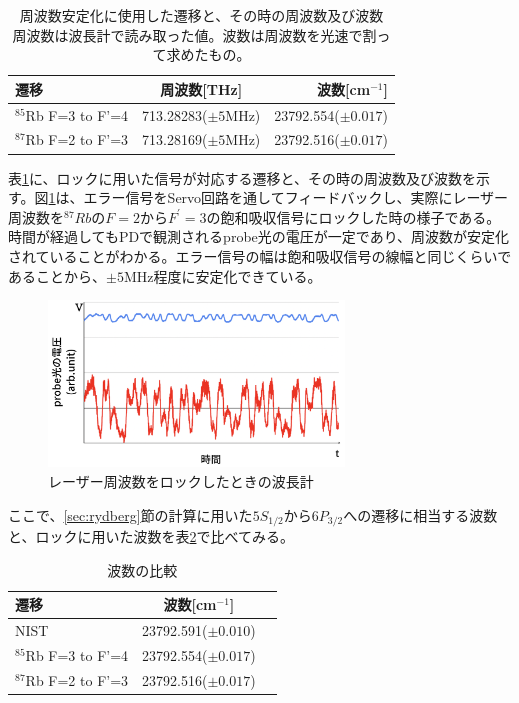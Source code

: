 \documentclass[dvipdfmx]{jsreport}
\begin{document}
\begin{table}[hbtp]
  \caption{周波数安定化に使用した遷移と、その時の周波数及び波数　周波数は波長計で読み取った値。波数は周波数を光速で割って求めたもの。}
  \label{table:lock}
  \centering
  \begin{tabular}{lcr}
    \hline
    遷移 & 周波数[THz] & 波数[cm$^{-1}$]  \\
    \hline
    $^{85}$Rb F=3 to F'=4  & 713.28283($\pm5$MHz) & 23792.554($\pm0.017$)  \\
    $^{87}$Rb F=2 to F'=3  & 713.28169($\pm5$MHz) & 23792.516($\pm0.017$)  \\
    \hline
  \end{tabular}
\end{table}
表\ref{table:lock}に、ロックに用いた信号が対応する遷移と、その時の周波数及び波数を示す。図\ref{fig:mt-lock}は、エラー信号をServo回路を通してフィードバックし、実際にレーザー周波数を$^{87}Rb$の$F=2$から$F^{'}=3$の飽和吸収信号にロックした時の様子である。時間が経過してもPDで観測されるprobe光の電圧が一定であり、周波数が安定化されていることがわかる。エラー信号の幅は飽和吸収信号の線幅と同じくらいであることから、$\pm 5$MHz程度に安定化できている。

\begin{figure}
\centering
\includegraphics[width=0.7\textwidth]{images/mt_lock.png}
\caption{\label{fig:mt-lock}レーザー周波数をロックしたときの波長計}
\end{figure}

ここで、\ref{sec:rydberg}節の計算に用いた$5S_{1/2}$から$6P_{3/2}$への遷移に相当する波数と、ロックに用いた波数を表\ref{table:k}で比べてみる。
\begin{table}[hbtp]
  \caption{波数の比較}
  \label{table:k}
  \centering
  \begin{tabular}{lcr}
    \hline
    遷移 & 波数[cm$^{-1}$]  \\
    \hline
    NIST\cite{nist} & 23792.591($\pm0.010$) \\
    $^{85}$Rb F=3 to F'=4  & 23792.554($\pm0.017$)  \\
    $^{87}$Rb F=2 to F'=3  & 23792.516($\pm0.017$)  \\
    \hline
  \end{tabular}
\end{table}
\end{document}
